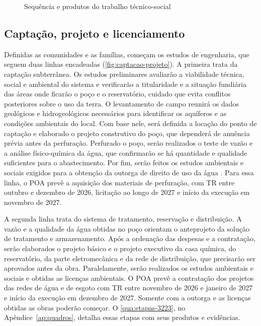 \begin{figure}[htbp]
  \centering
  \caption{Sequência e produtos do trabalho técnico-social}
  \label{fig:tts}
\end{figure}


\subsection{Captação, projeto e licenciamento}
\label{subsec:captacao}

Definidas as comunidades e as famílias, começam os estudos de engenharia,
que seguem duas linhas encadeadas (\autoref{fig:captacao-projeto}). A primeira
trata da captação subterrânea. Os estudos preliminares avaliarão a
viabilidade técnica, social e ambiental do sistema e verificarão a
titularidade e a situação fundiária das áreas onde ficarão o poço e o
reservatório, cuidado que evita conflitos posteriores sobre o uso da terra.
O levantamento de campo reunirá os dados geológicos e hidrogeológicos
necessários para identificar os aquíferos e as condições ambientais do
local. Com base nele, será definida a locação do ponto de captação e
elaborado o projeto construtivo do poço, que dependerá de anuência prévia
antes da perfuração. Perfurado o poço, serão realizados o teste de vazão e a
análise físico-química da água, que confirmarão se há quantidade e qualidade
suficientes para o abastecimento. Por fim, serão feitos os estudos ambientais
e sociais exigidos para a obtenção da outorga de direito de uso da água
\cite{mop2026}. Para essa linha, o POA prevê a aquisição dos materiais de
perfuração, com TR entre outubro e dezembro de 2026, licitação ao longo de
2027 e início da execução em novembro de 2027.

A segunda linha trata do sistema de tratamento, reservação e distribuição. A
vazão e a qualidade da água obtidas no poço orientam o anteprojeto da
solução de tratamento e armazenamento. Após a ordenação das despesas e a
contratação, serão elaborados o projeto básico e o projeto executivo da casa
química, do reservatório, da parte eletromecânica e da rede de distribuição,
que precisarão ser aprovados antes da obra. Paralelamente, serão realizados
os estudos ambientais e sociais e obtidas as licenças ambientais. O POA prevê
a contratação dos projetos das redes de água e de esgoto com TR entre
novembro de 2026 e janeiro de 2027 e início da execução em dezembro de 2027.
Somente com a outorga e as licenças obtidas as obras poderão começar. O
\autoref{qua:etapas-3223}, no Apêndice~\ref{ap:quadros}, detalha essas etapas
com seus produtos e evidências.

